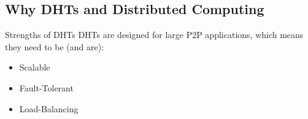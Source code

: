 \documentclass[11pt]{beamer}
\begin{document}
%
%	
\subsection{Why DHTs and Distributed Computing}

\begin{frame}{Strengths of DHTs }
	DHTs are designed for large P2P applications, which means they need to be (and are):
	\begin{itemize}
		\item Scalable
		\item Fault-Tolerant
		\item Load-Balancing
	\end{itemize}
	
\end{frame}

\end{document}
